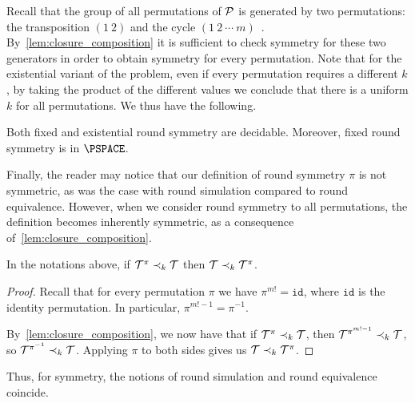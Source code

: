 Recall that the group of all permutations of $\mathcal{P}$ is generated by two permutations: the transposition $(1\ 2)$ and the cycle $(1\ 2\ \cdots\ m)$~\cite{Cameron1999}. By~\cref{lem:closure_composition} it is sufficient to check symmetry for these two generators in order to obtain symmetry for every permutation. Note that for the existential variant of the problem, even if every permutation requires a different $k$, by taking the product of the different values we conclude that there is a uniform $k$ for all permutations.
We thus have the following.
\begin{theorem}
\label{thm:symmetry_decidable}
Both fixed and existential round symmetry are decidable. Moreover, fixed round symmetry is in $\PSPACE$.
\end{theorem}

Finally, the reader may notice that our definition of round symmetry \WRT $\pi$ is not symmetric, as was the case with round simulation compared to round equivalence. However, when we consider round symmetry \WRT to all permutations, the definition becomes inherently symmetric, as a consequence of~\cref{lem:closure_composition}.
\begin{lemma}
\label{lem:round_symmetry_commutative}
    In the notations above, if $\mathcal{T}^{\pi}\prec_k \mathcal{T}$ then $\mathcal{T}\prec_k \mathcal{T}^\pi$.
\end{lemma}
\begin{proof}
    Recall that for every permutation $\pi$ we have $\pi^{m!}=\mathtt{id}$, where $\mathtt{id}$ is the identity permutation. In particular, $\pi^{m!-1}=\pi^{-1}$. 

    By~\cref{lem:closure_composition}, we now have that if $\mathcal{T}^{\pi}\prec_k \mathcal{T}$, then $\mathcal{T}^{\pi^{m!-1}}\prec_k \mathcal{T}$, so $\mathcal{T}^{\pi^{-1}}\prec_k \mathcal{T}$. Applying $\pi$ to both sides gives us $\mathcal{T}\prec_k \mathcal{T}^{\pi}$.
\end{proof}

Thus, for symmetry, the notions of round simulation and round equivalence coincide.
